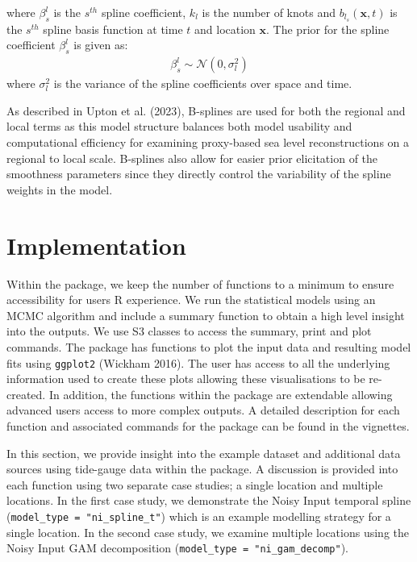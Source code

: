 where \(\beta^{l}_s\) is the \(s^{th}\) spline coefficient, \(k_l\) is the number of knots and \(b_{l_s}(\mathbf{x},t)\) is the \(s^{th}\) spline basis function at time \(t\) and location \(\mathbf{x}\). The prior for the spline coefficient \(\beta^{l}_s\) is given as:
\begin{align}
\beta^{l}_s \sim \mathcal{N}(0,\sigma_l^2)
\end{align}
where \(\sigma_l^2\) is the variance of the spline coefficients over space and time.

As described in Upton et al. (2023), B-splines are used for both the regional and local terms as this model structure balances both model usability and computational efficiency for examining proxy-based sea level reconstructions on a regional to local scale. B-splines also allow for easier prior elicitation of the smoothness parameters since they directly control the variability of the spline weights in the model.

\hypertarget{implementation}{%
\section{Implementation}\label{implementation}}

Within the package, we keep the number of functions to a minimum to ensure accessibility for users R experience. We run the statistical models using an MCMC algorithm and include a summary function to obtain a high level insight into the outputs. We use S3 classes to access the summary, print and plot commands. The package has functions to plot the input data and resulting model fits using \texttt{ggplot2} (Wickham 2016). The user has access to all the underlying information used to create these plots allowing these visualisations to be re-created. In addition, the functions within the package are extendable allowing advanced users access to more complex outputs. A detailed description for each function and associated commands for the  package can be found in the vignettes.

In this section, we provide insight into the example dataset and additional data sources using tide-gauge data within the  package. A discussion is provided into each function using two separate case studies; a single location and multiple locations. In the first case study, we demonstrate the Noisy Input temporal spline (\texttt{model\_type\ =\ "ni\_spline\_t"}) which is an example modelling strategy for a single location. In the second case study, we examine multiple locations using the Noisy Input GAM decomposition (\texttt{model\_type\ =\ "ni\_gam\_decomp"}).

